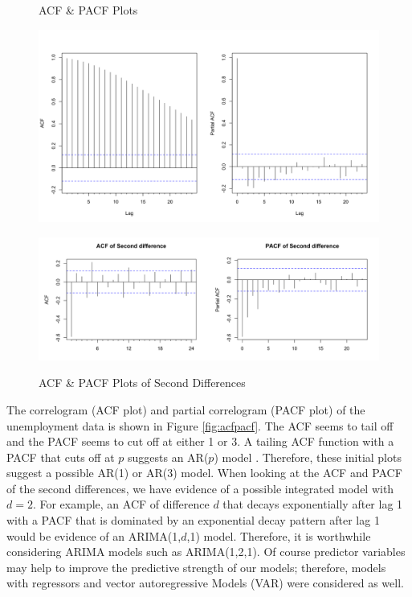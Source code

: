 \documentclass[twoside,twocolumn]{article}
\begin{document}
 
    \begin{figure}[hbt]
    	\centering
     	\caption{ACF \& PACF Plots}
     	\includegraphics[width=\linewidth]{images/acfpacf}
     	\label{fig:acfpacf}
     	\caption{ACF \& PACF Plots of Second Differences}
     	\includegraphics[width=\linewidth]{images/acfpacf2d}
     	\label{fig:acfpacf2}
      \end{figure}

  The correlogram (ACF plot) and partial correlogram (PACF plot) of the unemployment data is shown in Figure \ref{fig:acfpacf}. The ACF seems to tail off and the PACF seems to cut off at either 1 or 3.  A tailing ACF function with a PACF that cuts off at \(p\) suggests an AR(\(p\)) model \citep{Box2008}. Therefore, these initial plots suggest a possible AR(1) or AR(3) model. When looking at the ACF and PACF of the second differences, we have evidence of a possible integrated model with \(d=2\). For example, an ACF of difference \(d\) that decays exponentially after lag 1 with a PACF that is dominated by an exponential decay pattern after lag 1 would be evidence of an ARIMA(1,\(d\),1) model. Therefore, it is worthwhile considering ARIMA models such as ARIMA(1,2,1). Of course predictor variables may help to improve the predictive strength of our models; therefore, models with regressors and vector autoregressive Models (VAR) were considered as well.
\end{document}
